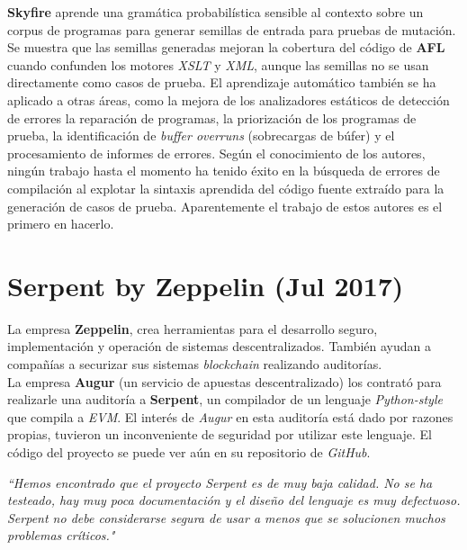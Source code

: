 \textbf{Skyfire}\cite{Wang:Chen:Wei:Liu:Skyfire} aprende una gramática probabilística sensible al contexto sobre un corpus de programas para generar semillas de entrada para pruebas de mutación. Se muestra que las semillas generadas mejoran la cobertura del código de \textbf{AFL}\cite{AFL} cuando confunden los motores \textit{XSLT} y \textit{XML}, aunque las semillas no se usan directamente como casos de prueba. El aprendizaje automático también se ha aplicado a otras áreas, como la mejora de los analizadores estáticos de detección de errores \cite{Heo:Oh:Yi:Unsound}\cite{Koc:Saadatpanah:Jeffrey:Porter:False} la reparación de programas\cite{Koukoutos:Raghothaman:Kneuss:Kuncak}\cite{White:Tufano:Martinez:Monperrus}, la priorización de los programas de prueba\cite{Chen:Bai:Hao:Xiong:Zhang}, la identificación de \textit{buffer overruns} (sobrecargas de búfer)\cite{Choi:Jeong:Oh:Choo:BufferOverruns} y el procesamiento de informes de errores\cite{Xuan:Ming:Buggy}\cite{Lam:Anh:Nguyen:Nguyen:DeepLearning}. Según el conocimiento de los autores, ningún trabajo hasta el momento ha tenido éxito en la búsqueda de errores de compilación al explotar la sintaxis aprendida del código fuente extraído para la generación de casos de prueba. Aparentemente el trabajo de estos autores es el primero en hacerlo.

\section{Serpent by Zeppelin (Jul 2017)}

La empresa \textbf{Zeppelin}, crea herramientas para el desarrollo seguro, implementación y operación de sistemas descentralizados. También ayudan a compañías a securizar sus sistemas \textit{blockchain} realizando auditorías.\\

La empresa \textbf{Augur} (un servicio de apuestas descentralizado) los contrató para realizarle una auditoría a \textbf{Serpent}, un compilador de un lenguaje \textit{Python-style} que compila a \textit{EVM}. El interés de \textit{Augur} en esta auditoría está dado por razones propias, tuvieron un inconveniente de seguridad por utilizar este lenguaje. El código del proyecto se puede ver aún en su repositorio de \textit{GitHub}\cite{SerpentRepository}.\\

\begin{displayquote}
    \textit{``Hemos encontrado que el proyecto Serpent es de muy baja calidad. No se ha testeado, hay muy poca documentación y el diseño del lenguaje es muy defectuoso. Serpent no debe considerarse segura de usar a menos que se solucionen muchos problemas críticos."}
\end{displayquote}

